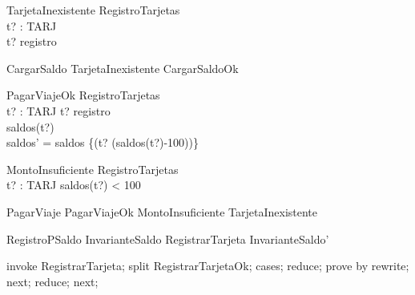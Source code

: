 \begin{schema}{TarjetaInexistente}
    \Xi RegistroTarjetas \\
    t? : TARJ \\
\where
    t? \notin registro \\ 
\end{schema}

\begin{zed}
    CargarSaldo  TarjetaInexistente \lor CargarSaldoOk \\
\end{zed}

\begin{schema}{PagarViajeOk}
    \Delta RegistroTarjetas \\
    t? : TARJ 
\where
    t? \in registro \\
    saldos(t?)  \\
    saldos' = saldos \cup \{(t? \mapsto (saldos(t?)-100))\} 
\end{schema}

\begin{schema}{MontoInsuficiente}
    \Xi RegistroTarjetas \\
    t? : TARJ 
\where
    saldos(t?) < 100 \\
\end{schema}

\begin{zed}
    PagarViaje  PagarViajeOk \lor MontoInsuficiente \lor TarjetaInexistente \\
\end{zed}

\begin{theorem}{RegistroPSaldo}
    InvarianteSaldo \land  RegistrarTarjeta \implies  InvarianteSaldo'
\end{theorem}

\begin{zproof}[RegistroPSaldo]
    invoke RegistrarTarjeta;
    split RegistrarTarjetaOk;
    cases;
    reduce;
    prove by rewrite;
    next;
    reduce;
    next;
\end{zproof}
